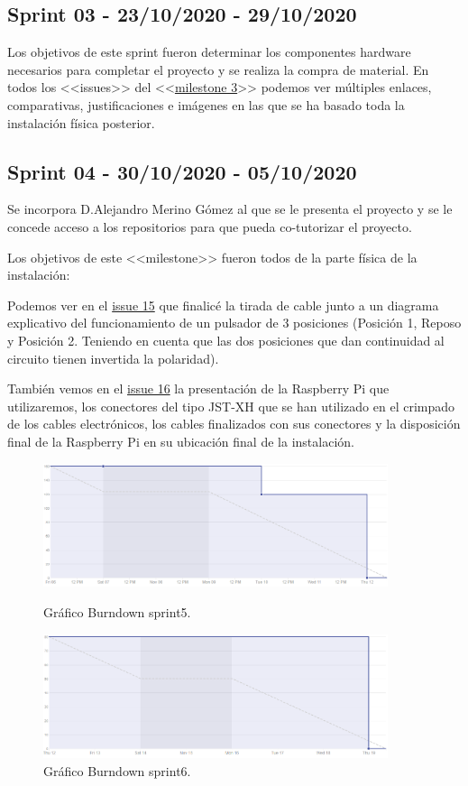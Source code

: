 \subsection{Sprint 03 - 23/10/2020 - 29/10/2020}
Los objetivos de este sprint fueron determinar los componentes hardware necesarios para completar el proyecto y se realiza la compra de material.
En todos los <<issues>> del <<\href{https://github.com/davidelinformatico/TFG/milestone/3?closed=1}{milestone 3}>> podemos ver múltiples enlaces, comparativas, justificaciones e imágenes en las que se ha basado toda la instalación física posterior.

\subsection{Sprint 04 - 30/10/2020 - 05/10/2020}
Se incorpora D.Alejandro Merino Gómez al que se le presenta el proyecto y se le concede acceso a los repositorios para que pueda co-tutorizar el proyecto.

Los objetivos de este <<milestone>> fueron todos de la parte física de la instalación:
\item Podemos ver en el \href{https://github.com/davidelinformatico/TFG/issues/15}{issue 15} que finalicé la tirada de cable junto a un diagrama explicativo del funcionamiento de un pulsador de 3 posiciones (Posición 1, Reposo y Posición 2. Teniendo en cuenta que las dos posiciones que dan continuidad al circuito tienen invertida la polaridad).
\item También vemos en el \href{https://github.com/davidelinformatico/TFG/issues/16}{issue 16} la presentación de la Raspberry Pi que utilizaremos, los conectores del tipo JST-XH que se han utilizado en el crimpado de los cables electrónicos, los cables finalizados con sus conectores y la disposición final de la Raspberry Pi en su ubicación final de la instalación.

\begin{figure}
    \centering
    \includegraphics[width=0.9\textwidth]{img/BurnDown/5.PNG}
    \caption{Gráfico Burndown sprint5. } \label{BD5}
    \includegraphics[width=0.9\textwidth]{img/BurnDown/6.PNG}
    \caption{Gráfico Burndown sprint6. } \label{BD6}
\end{figure}

